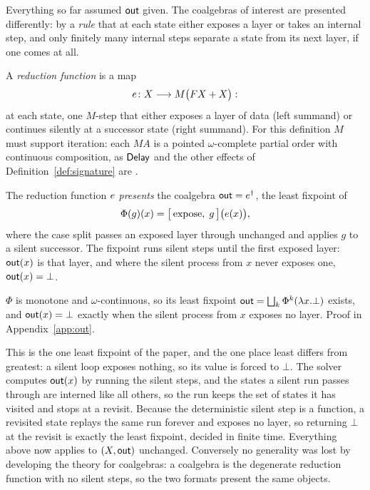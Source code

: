 Everything so far assumed $\mathsf{out}$ given. The coalgebras of interest are presented differently:
by a \emph{rule} that at each state either exposes a layer or takes an internal step, and only
finitely many internal steps separate a state from its next layer, if one comes at all.

\begin{definition}\label{def:reduction}
  A \emph{reduction function} is a map
  \[
    e \colon X \longrightarrow M\big(F X + X\big):
  \]
  at each state, one $M$-step that either exposes a layer of data (left summand) or continues
  silently at a successor state (right summand). For this definition $M$ must support
  iteration: each $M A$ is a pointed $\omega$-complete partial order with continuous
  composition, as $\mathsf{Delay}$ and the other effects of Definition~\ref{def:signature} are
  \cite{adamek2006-iterative-algebras, goncharov2016-complete-elgot-monads}.
\end{definition}

\begin{definition}\label{def:out}
  The reduction function $e$ \emph{presents} the coalgebra $\mathsf{out} = e^{\dagger}$, the
  least fixpoint of
  \[
    \Phi(g)(x) = \big[\,\text{expose},\; g\,\big]\big(e(x)\big),
  \]
  where the case split passes an exposed layer through unchanged and applies $g$ to a silent
  successor. The fixpoint runs silent steps until the first exposed layer: $\mathsf{out}(x)$ is that
  layer, and where the silent process from $x$ never exposes one, $\mathsf{out}(x) = \bot$.
\end{definition}

\begin{proposition}\label{prop:out}
  $\Phi$ is monotone and $\omega$-continuous, so its least fixpoint
  $\mathsf{out} = \bigsqcup_k \Phi^k(\lambda x.\bot)$ exists, and $\mathsf{out}(x) = \bot$ exactly when the
  silent process from $x$ exposes no layer. Proof in Appendix~\ref{app:out}.
\end{proposition}

\noindent
This is the one least fixpoint of the paper, and the one place least differs from greatest: a
silent loop exposes nothing, so its value is forced to $\bot$. The solver computes $\mathsf{out}(x)$
by running the silent steps, and the states a silent run passes through are interned like all
others, so the run keeps the set of states it has visited and stops at a revisit. Because the
deterministic silent step is a function, a revisited state replays the same run forever and
exposes no layer, so returning $\bot$ at the revisit is exactly the least fixpoint, decided in
finite time. Everything above now applies to
$(X, \mathsf{out})$ unchanged. Conversely no generality was lost by developing the theory for
coalgebras: a coalgebra is the degenerate reduction function with no silent steps, so the two
formats present the same objects.

